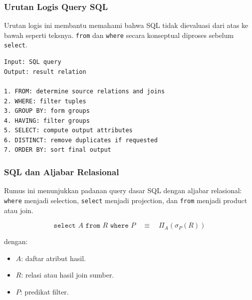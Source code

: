\subsubsection{Urutan Logis Query SQL}

\begin{jawab}
Urutan logis ini membantu memahami bahwa SQL tidak dievaluasi dari atas ke bawah seperti teksnya. \texttt{from} dan \texttt{where} secara konseptual diproses sebelum \texttt{select}.
\end{jawab}

\begin{lstlisting}[caption={Urutan logis query SQL}, label={lst:sql-logical-order}]
Input: SQL query
Output: result relation

1. FROM: determine source relations and joins
2. WHERE: filter tuples
3. GROUP BY: form groups
4. HAVING: filter groups
5. SELECT: compute output attributes
6. DISTINCT: remove duplicates if requested
7. ORDER BY: sort final output
\end{lstlisting}

\subsubsection{SQL dan Aljabar Relasional}

\begin{jawab}
Rumus ini menunjukkan padanan query dasar SQL dengan aljabar relasional: \texttt{where} menjadi selection, \texttt{select} menjadi projection, dan \texttt{from} menjadi product atau join.
\end{jawab}

\begin{equation}
    \texttt{select } A \texttt{ from } R \texttt{ where } P
    \quad \equiv \quad
    \Pi_A(\sigma_P(R))
    \label{eq:sql-ra-basic}
\end{equation}

dengan:
\begin{itemize}
    \item \(A\): daftar atribut hasil.
    \item \(R\): relasi atau hasil join sumber.
    \item \(P\): predikat filter.
\end{itemize}
